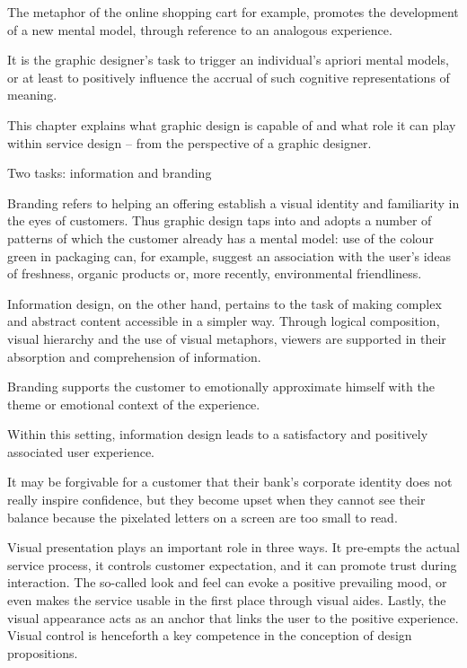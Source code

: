 The metaphor of the online shopping cart for example, promotes the development of a new mental model, through reference to an analogous experience. %

It is the graphic designer’s task to trigger an individual’s apriori mental models, or at least to positively influence the accrual of such cognitive representations of meaning.

This chapter explains what graphic design is capable of and what role it can play within service design – from the perspective of a graphic designer.

Two tasks: information and branding

Branding refers to helping an offering establish a visual identity and familiarity in the eyes of customers. Thus graphic design taps into and adopts a number of patterns of which the customer already has a mental model: use of the colour green in packaging can, for example, suggest an association with the user’s ideas of freshness, organic products or, more recently, environmental friendliness.

Information design, on the other hand, pertains to the task of making complex and abstract content accessible in a simpler way. Through logical composition, visual hierarchy and the use of visual metaphors, viewers are supported in their absorption and comprehension of information.

Branding supports the customer to emotionally approximate himself with the theme or emotional context of the experience.

Within this setting, information design leads to a satisfactory and positively associated user experience.

 It may be forgivable for a customer that their bank’s corporate identity does not really inspire confidence, but they become upset when they cannot see their balance because the pixelated letters on a screen are too small to read.

Visual presentation plays an important role in three ways. It pre-empts the actual service process, it controls customer expectation, and it can promote trust during interaction. The so-called look and feel can evoke a positive prevailing mood, or even makes the service usable in the first place through visual aides. Lastly, the visual appearance acts as an anchor that links the user to the positive experience. Visual control is henceforth a key competence in the conception of design propositions.

